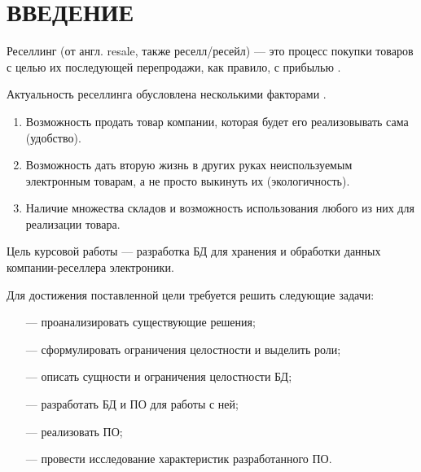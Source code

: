 \chapter*{\hfill{\centering ВВЕДЕНИЕ}\hfill}

Реселлинг (от англ. resale, также реселл/ресейл) --- это процесс покупки товаров с целью их последующей перепродажи, как правило, с прибылью \cite{src_resell}.

Актуальность реселлинга обусловлена несколькими факторами \cite{src_resell}.
\begin{enumerate}
	\item Возможность продать товар компании, которая будет его реализовывать сама (удобство).
	\item Возможность дать вторую жизнь в других руках неиспользуемым электронным товарам, а не просто выкинуть их (экологичность).
	\item Наличие множества складов и возможность использования любого из них для реализации товара.
\end{enumerate}

Цель курсовой работы --- разработка БД для хранения и обработки данных компании-реселлера электроники.

Для достижения поставленной цели требуется решить следующие задачи:
\begin{itemize}
	\item[---] проанализировать существующие решения;
	\item[---] сформулировать ограничения целостности и выделить роли;
	\item[---] описать сущности и ограничения целостности БД;
	\item[---] разработать БД и ПО для работы с ней;
	\item[---] реализовать ПО;
	\item[---] провести исследование характеристик разработанного ПО.
\end{itemize}
